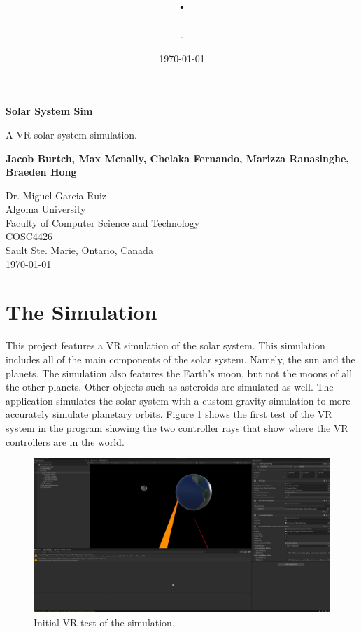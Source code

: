 \documentclass{article}
\author{.}
\title{.}
\date{\today}
\begin{document}
    \begin{titlepage}
        \begin{center}
            \vspace*{\fill}

            \Huge
            \textbf{Solar System Sim}

            \vspace{0.5cm}
            \Large
            A VR solar system simulation.

            \vspace{1.5cm}

            \textbf{Jacob Burtch, Max Mcnally, Chelaka Fernando, Marizza Ranasinghe, Braeden Hong}

            \Large
            Dr. Miguel Garcia-Ruiz\\
            Algoma University\\
            Faculty of Computer Science and Technology\\
            COSC4426\\
            Sault Ste. Marie, Ontario, Canada\\
            \today
            \vspace*{\fill}
        \end{center}
    \end{titlepage}
    \newpage
    \section{The Simulation}
    This project features a VR simulation of the solar system. This simulation includes all of the main components of the solar system. Namely, the sun and the planets. The simulation also features the Earth's moon, but not the moons of all the other planets. Other objects such as asteroids are simulated as well. The application simulates the solar system with a custom gravity simulation to more accurately simulate planetary orbits. Figure \ref{initialvr} shows the first test of the VR system in the program showing the two controller rays that show where the VR controllers are in the world.
    \begin{figure}[h]
        \centering
        \includegraphics[scale=0.25]{vr_test1.jpg}
        \caption{Initial VR test of the simulation.}
        \label{initialvr}
    \end{figure}
\end{document}
